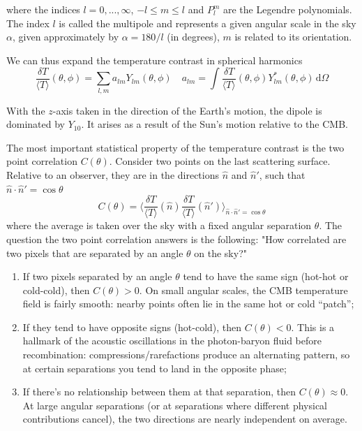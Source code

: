 where the indices $l = 0, ..., \infty$, $-l\leq m \leq l$ and $P_{l}^{m}$ are the Legendre polynomials. The index $l$ is called the multipole and represents a given angular scale in the sky $\alpha$, given approximately by $\alpha = 180/l$ (in degrees), $m$ is related to its orientation.
\par We can thus expand the temperature contrast in spherical harmonics
\begin{equation}
    \frac{\delta T}{\langle T \rangle}(\theta, \phi) = \sum_{l,m} a_{lm}Y_{lm}(\theta,\phi) \quad a_{lm} = \int \frac{\delta T}{\langle T \rangle}(\theta, \phi) Y_{lm}^{*}(\theta,\phi)\,\text{d}\Omega
    \label{eq:tempcont_exp}
\end{equation}
\par With the $z$-axis taken in the direction of the Earth’s motion, the dipole is dominated by $Y_{10}$. It arises as a result of the Sun’s motion relative to the CMB.
\par The most important statistical property of the temperature contrast is the two point correlation $C(\theta)$. Consider two points on the last scattering surface. Relative to an observer, they are in the directions $\hat{n}$ and $\hat{n}'$, such that $\hat{n}\cdot\hat{n}' = \cos\theta$
\begin{equation}
    C(\theta) = \langle \frac{\delta T}{\langle T \rangle}(\hat{n})\frac{\delta T}{\langle T \rangle}(\hat{n}') \rangle_{\hat{n}\cdot\hat{n}' = \cos\theta}
\end{equation}
where the average is taken over the sky with a fixed angular separation $\theta$. The question the two point correlation answers is the following: "How correlated are two pixels that are separated by an angle $\theta$ on the sky?"
\begin{enumerate}
    \item If two pixels separated by an angle $\theta$ tend to have the same sign (hot-hot or cold-cold), then $C(\theta) > 0$. On small angular scales, the CMB temperature field is fairly smooth: nearby points often lie in the same hot or cold “patch”;
    \item If they tend to have opposite signs (hot-cold), then $C(\theta) < 0$. This is a hallmark of the acoustic oscillations in the photon-baryon fluid before recombination: compressions/rarefactions produce an alternating pattern, so at certain separations you tend to land in the opposite phase;
    \item If there’s no relationship between them at that separation, then $C(\theta) \approx 0$. At large angular separations (or at separations where different physical contributions cancel), the two directions are nearly independent on average.
\end{enumerate}
